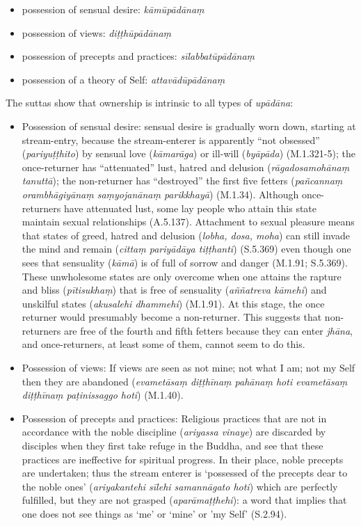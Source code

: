\begin{itemize}
\item possession of sensual desire: \textit{kāmūpādānaṃ}
\item possession of views: \textit{diṭṭhūpādānaṃ}
\item possession of precepts and practices: \textit{sīlabbatūpādānaṃ}
\item possession of a theory of Self: \textit{attavādūpādānaṃ}
\end{itemize}

The suttas show that ownership is intrinsic to all types of \textit{upādāna}:

\begin{itemize}

\item Possession of sensual desire: sensual desire is gradually worn down, starting at stream-entry, because the stream-enterer is apparently ``not obsessed'' (\textit{pariyuṭṭhito}) by sensual love (\textit{kāmarāga}) or ill-will (\textit{byāpāda}) (M.1.321-5); the once-returner has ``attenuated'' lust, hatred and delusion (\textit{rāgadosamohānaṃ tanuttā}); the non-returner has ``destroyed'' the first five fetters (\textit{pañcannaṃ orambhāgiyānaṃ saṃyojanānaṃ parikkhayā}) (M.1.34). Although once-returners have attenuated lust, some lay people who attain this state maintain sexual relationships (A.5.137). Attachment to sexual pleasure means that states of greed, hatred and delusion (\textit{lobha, dosa, moha}) can still invade the mind and remain (\textit{cittaṃ pariyādāya tiṭṭhanti}) (S.5.369) even though one sees that sensuality (\textit{kāmā}) is of full of sorrow and danger (M.1.91; S.5.369). These unwholesome states are only overcome when one attains the rapture and bliss (\textit{pītisukhaṃ}) that is free of sensuality (\textit{aññatreva kāmehi}) and unskilful states (\textit{akusalehi dhammehi}) (M.1.91). At this stage, the once returner would presumably become a non-returner. This suggests that non-returners are free of the fourth and fifth fetters because they can enter \textit{jh\=ana}, and once-returners, at least some of them, cannot seem to do this.

\item Possession of views: If views are seen as not mine; not what I am; not my Self then they are abandoned (\textit{evametāsaṃ diṭṭhīnaṃ pahānaṃ hoti evametāsaṃ diṭṭhīnaṃ paṭinissaggo hoti}) (M.1.40).

\item Possession of precepts and practices: Religious practices that are not in accordance with the noble discipline (\textit{ariyassa vinaye}) are discarded by disciples when they first take refuge in the Buddha, and see that these practices are ineffective for spiritual progress. In their place, noble precepts are undertaken; thus the stream enterer is `possessed of the precepts dear to the noble ones' (\textit{ariyakantehi sīlehi samannāgato hoti}) which are perfectly fulfilled, but they are not grasped (\textit{aparāmaṭṭhehi}): a word that implies that one does not see things as `me' or `mine' or 'my Self' (S.2.94).


\end{itemize}
